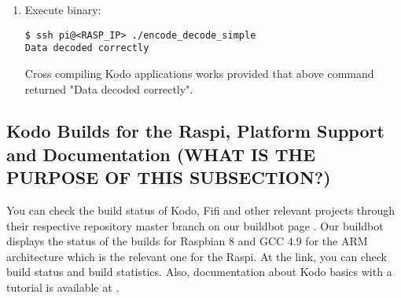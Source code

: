 \begin{enumerate}
\item Execute binary:
\begin{lstlisting}[]
$ ssh pi@<RASP_IP> ./encode_decode_simple
Data decoded correctly
\end{lstlisting}
\FloatBarrier
\vspace{-5mm}

Cross compiling Kodo applications works provided that above command
returned "Data decoded correctly".

%
%
%


\end{enumerate}

\subsection{Kodo Builds for the \ac{Raspi}, Platform Support and Documentation (WHAT IS THE PURPOSE OF THIS SUBSECTION?)}

You can check the build status of Kodo, Fifi and other relevant projects
through their respective repository master branch on our buildbot page
\cite{steinwurf2016buildbot}. Our buildbot displays the status of the builds
for Raspbian 8 and GCC 4.9 for the ARM architecture which is the relevant one
for the \ac{Raspi}. At the link, you can check build status and build
statistics. Also, documentation about Kodo basics with a tutorial is available
at \cite{kododocs}.






